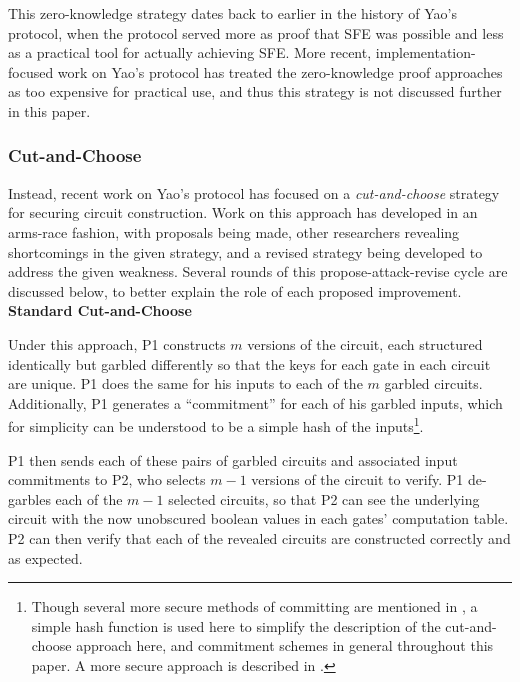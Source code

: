 This zero-knowledge strategy dates back to earlier in the history of Yao's protocol, when the protocol served more as proof that \ac{SFE} was possible and less as a practical tool for actually achieving \ac{SFE}. More recent, implementation-focused work on Yao's protocol has treated the zero-knowledge proof approaches as too expensive for practical use\cite{lindell2007efficient, mohassel2006efficiency, malkhi2004fairplay}, and thus this strategy is not discussed further in this paper.

\subsubsection{Cut-and-Choose}
\label{sec:cutchoosesimple}

Instead, recent work on Yao's protocol has focused on a \emph{cut-and-choose} strategy for securing circuit construction\cite{malkhi2004fairplay}. Work on this approach has developed in an arms-race fashion, with proposals being made, other researchers revealing shortcomings in the given strategy, and a revised strategy being developed to address the given weakness. Several rounds of this propose-attack-revise cycle are discussed below, to better explain the role of each proposed improvement.\\[.5em]

\noindent\textbf{Standard Cut-and-Choose}

Under this approach, \ac{P1} constructs $m$ versions of the circuit, each structured identically but garbled differently so that the keys for each gate in each circuit are unique. \ac{P1} does the same for his inputs to each of the $m$ garbled circuits. Additionally, \ac{P1} generates a ``commitment'' for each of his garbled inputs, which for simplicity can be understood to be a simple hash of the inputs\footnote{Though several more secure methods of committing are mentioned in \cite{lindell2007efficient}, a simple hash function is used here to simplify the description of the cut-and-choose approach here, and commitment schemes in general throughout this paper.  A more secure approach is described in \cite{halevi1996practical}.}.

\ac{P1} then sends each of these pairs of garbled circuits and associated input commitments to \ac{P2}, who selects $m-1$ versions of the circuit to verify.  \ac{P1} de-garbles each of the $m-1$ selected circuits, so that \ac{P2} can see the underlying circuit with the now unobscured boolean values in each gates' computation table.  \ac{P2} can then verify that each of the revealed circuits are constructed correctly and as expected.


